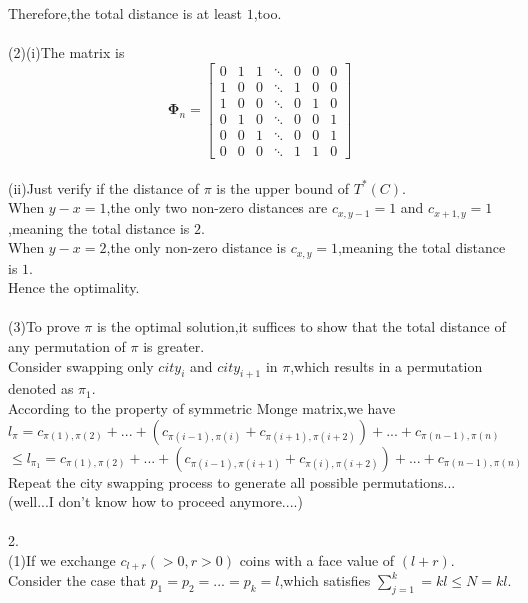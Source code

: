 \documentclass{article}
\begin{document}
Therefore,the total distance is at least $1$,too.\\
\\
(2)(i)The matrix  is
\[
\mathbf{\Phi}_n = \begin{bmatrix}
0      & 1       & 1      & \ddots & 0      & 0      & 0 \\
1      & 0       & 0      & \ddots & 1      & 0      & 0 \\
1     & 0       & 0      & \ddots & 0 & 1 & 0 \\
0      & 1       & 0      & \ddots & 0      & 0      & 1 \\
0      & 0       & 1      & \ddots & 0      & 0      & 1 \\
0      & 0       & 0      & \ddots & 1      & 1      & 0
\end{bmatrix}
\]\\
(ii)Just verify if the distance of $\pi$ is the upper bound of $T^*(C)$.\\
When $y-x=1$,the only two non-zero distances are $c_{x,y-1}=1$ and $c_{x+1,y}=1$,meaning the total distance is $2$.\\
When $y-x=2$,the only non-zero distance is $c_{x,y}=1$,meaning the total distance is $1$.\\
Hence the optimality.\\
\\
(3)To prove $\pi$ is the optimal solution,it suffices to show that the total distance of any permutation of  $\pi$ is greater.\\
Consider swapping only $city_i$ and $city_{i+1}$ in $\pi$,which results in a permutation denoted as $\pi_1$.\\
According to the property of symmetric Monge matrix,we have\\
$l_\pi=c_{\pi(1),\pi(2)}+...+(c_{\pi(i-1),\pi(i)}+c_{\pi(i+1),\pi(i+2)})+...+c_{\pi(n-1),\pi(n)}
$\\
$\leq
l_{\pi_1}=c_{\pi(1),\pi(2)}+...+(c_{\pi(i-1),\pi(i+1)}+c_{\pi(i),\pi(i+2)})+...+c_{\pi(n-1),\pi(n)}$\\
Repeat the city swapping process to generate all possible permutations...\\(well...I don't know how to proceed anymore....)\\
\\
2.\\
(1)If we exchange $c_{l+r}(>0,r>0)$ coins with a face value of  $(l+r)$.\\Consider the case that $p_1=p_2=...=p_k=l$,which satisfies $\sum_{j=1}^k=kl\leq N=kl$.\\
\end{document}
